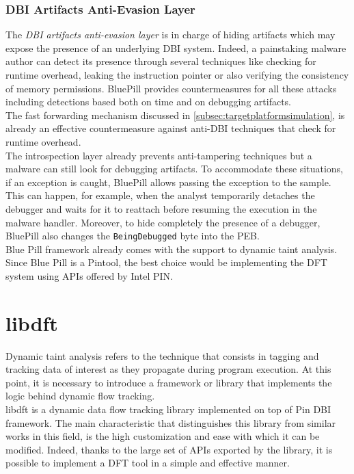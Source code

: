 \documentclass[LaM,binding=0.6cm]{sapthesis}
\begin{document}
\subsubsection{DBI Artifacts Anti-Evasion Layer}
The \textit{DBI artifacts anti-evasion layer} is in charge of hiding artifacts which may expose the presence of an underlying DBI system. Indeed, a painstaking malware author can detect its presence through several techniques like checking for runtime overhead, leaking the instruction pointer or also verifying the consistency of memory permissions. BluePill provides countermeasures for all these attacks including detections based both on time and on debugging artifacts.\\
The fast forwarding mechanism discussed in \autoref{subsec:targetplatformsimulation}, is already an effective countermeasure against anti-DBI techniques that check for runtime overhead.\\
The introspection layer already prevents anti-tampering techniques but a malware can still look for debugging artifacts. To accommodate these situations, if an exception is caught, BluePill allows passing the exception to the sample. This can happen, for example, when the analyst temporarily detaches the debugger and waits for it to reattach before resuming the execution in the malware handler. Moreover, to hide completely the presence of a debugger, BluePill also changes the \texttt{BeingDebugged} byte into the PEB.\\

Blue Pill framework already comes with the support to dynamic taint analysis. Since Blue Pill is a Pintool, the best choice would be implementing the DFT system using APIs offered by Intel PIN.

\section{libdft}
Dynamic taint analysis refers to the technique that consists in tagging and tracking data of interest as they propagate during program execution. At this point, it is necessary to introduce a framework or library that implements the logic behind dynamic flow tracking.\\
libdft\cite{kemerlis2012libdft} is a dynamic data flow tracking library implemented on top of Pin DBI framework. The main characteristic that distinguishes this library from similar works in this field\cite{bosman2011minemu}\cite{qin2006lift}, is the high customization and ease with which it can be modified. Indeed, thanks to the large set of APIs exported by the library, it is possible to implement a DFT tool in a simple and effective manner.
\end{document}
